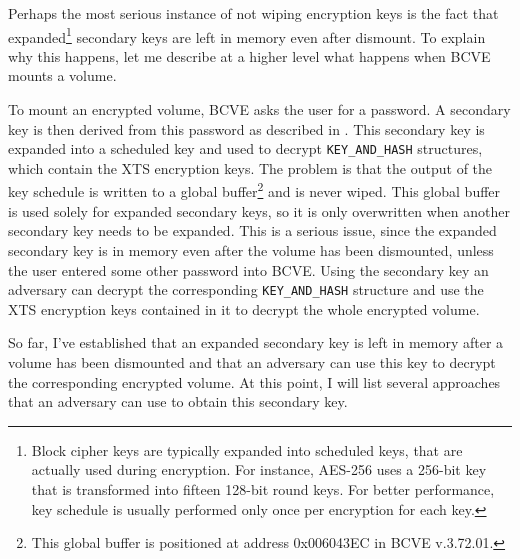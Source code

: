 \documentclass[thesis=B,english]{FITthesis}[2012/10/20]
\begin{document}
	Perhaps the most serious instance of not wiping encryption keys is the fact that expanded\footnote{Block cipher keys are typically expanded into scheduled keys, that are actually used during encryption. For instance, AES-256 uses a 256-bit key that is transformed into fifteen 128-bit round keys. For better performance, key schedule is usually performed only once per encryption for each key.} secondary keys are left in memory even after dismount. To explain why this happens, let me describe at a higher level what happens when BCVE mounts a volume.
	
	To mount an encrypted volume, BCVE asks the user for a password. A secondary key is then derived from this password as described in . This secondary key is expanded into a scheduled key and used to decrypt \verb|KEY_AND_HASH| structures, which contain the XTS encryption keys. The problem is that the output of the key schedule is written to a global buffer\footnote{This global buffer is positioned at address 0x006043EC in BCVE v.3.72.01.} and is never wiped. This global buffer is used solely for expanded secondary keys, so it is only overwritten when another secondary key needs to be expanded. This is a serious issue, since the expanded secondary key is in memory even after the volume has been dismounted, unless the user entered some other password into BCVE. Using the secondary key an adversary can decrypt the corresponding \verb|KEY_AND_HASH| structure and use the XTS encryption keys contained in it to decrypt the whole encrypted volume.
	
	So far, I've established that an expanded secondary key is left in memory after a volume has been dismounted and that an adversary can use this key to decrypt the corresponding encrypted volume. At this point, I will list several approaches that an adversary can use to obtain this secondary key.
	
\end{document}
